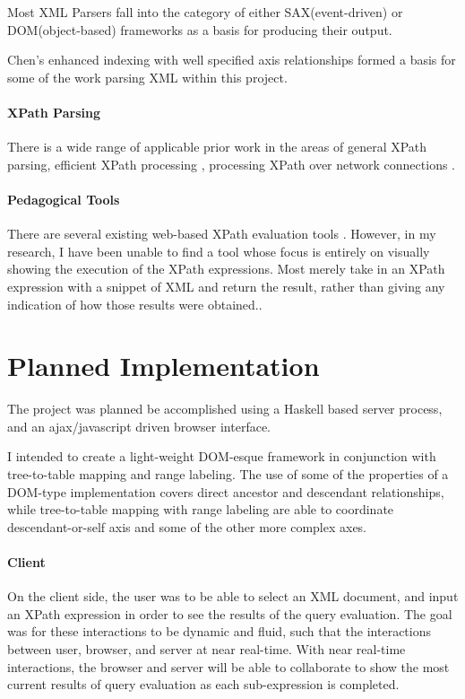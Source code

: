 \documentclass{acm_proc_article-sp}
\begin{document}
Most XML Parsers fall into the category of either SAX(event-driven) or DOM(object-based) frameworks as a basis for producing their output.

Chen's enhanced indexing\cite{chen:indexing} with well specified axis relationships formed a basis for some of the work parsing XML within this project.

\paragraph{XPath Parsing}
There is a wide range of applicable prior work in the areas of general XPath parsing\cite{scardina:building, schmidt:design, xpathtokenizer}, efficient XPath processing \cite{1071614}, processing XPath over network connections \cite{1316696}.


\paragraph{Pedagogical Tools}

There are several existing web-based XPath evaluation tools \cite{futurelab, whitebeam, wwbkb}.  However, in my research, I have been unable to find a tool whose focus is entirely on visually showing the execution of the XPath expressions.  Most merely take in an XPath expression with a snippet of XML and return the result, rather than giving any indication of how those results were obtained..


\section{Planned Implementation}
The project was planned be accomplished using a Haskell based server process, and an ajax/javascript driven browser interface.  

I intended to create a light-weight DOM-esque framework in conjunction with tree-to-table mapping and range labeling.  The use of some of the properties of a DOM-type implementation covers direct ancestor and descendant relationships, while tree-to-table mapping with range labeling are able to coordinate descendant-or-self axis and some of the other more complex axes.

\paragraph{Client}
On the client side, the user was to be able to select an XML document, and input an XPath expression in order to see the results of the query evaluation. The goal was for these interactions to be dynamic and fluid, such that the interactions between user, browser, and server at near real-time.  With near real-time interactions, the browser and server will be able to collaborate to show the most current results of query evaluation as each sub-expression is completed.
\end{document}
